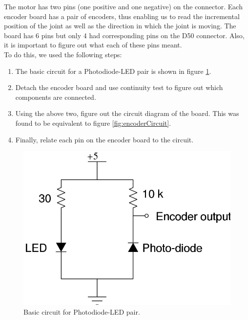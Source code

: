 \documentclass[10pt,a4paper]{article}
\begin{document}
The motor has two pins (one positive and one negative) on the
connector. Each encoder board has a pair of encoders, thus enabling us
to read the incremental position of the joint as well as the direction
in which the joint is moving. The board has 6 pins but only 4 had
corresponding pins on the D50 connector. Also, it is important to
figure out what each of these pins meant.\\

To do this, we used the following steps:
\begin{enumerate}
\item The basic circuit for a Photodiode-LED pair is shown in figure
  \ref{fig:photodiodeLEDPair}. 
\item Detach the encoder board and use continuity test to figure out
  which components are connected.
\item Using the above two, figure out the circuit diagram of the
  board. This was found to be equivalent to figure
  \ref{fig:encoderCircuit}. 
\item Finally, relate each pin on the encoder board to the
  circuit. 
\end{enumerate}

\begin{figure}[h]
    \centering
    \includegraphics[scale=0.5]{SimpleEncoder.jpg}
    \caption{Basic circuit for Photodiode-LED pair.}
    \label{fig:photodiodeLEDPair}
\end{figure}
\end{document}
